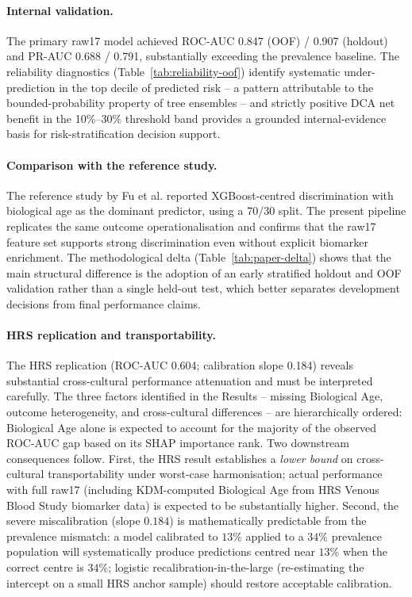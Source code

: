 \documentclass[11pt,a4paper]{article}
\begin{document}
\paragraph{Internal validation.}
The primary raw17 model achieved ROC-AUC 0.847 (OOF) / 0.907 (holdout) and PR-AUC 0.688 / 0.791,
substantially exceeding the prevalence baseline. The reliability diagnostics
(Table~\ref{tab:reliability-oof}) identify systematic under-prediction in the top decile of predicted
risk -- a pattern attributable to the bounded-probability property of tree ensembles\cite{NiculescuMizil2005}
-- and strictly positive DCA net benefit in the 10\%--30\% threshold band provides a grounded
internal-evidence basis for risk-stratification decision support.

\paragraph{Comparison with the reference study.}
The reference study by Fu et al.\cite{Fu2025} reported XGBoost-centred discrimination with biological
age as the dominant predictor, using a 70/30 split. The present pipeline replicates the same outcome
operationalisation and confirms that the raw17 feature set supports strong discrimination even without
explicit biomarker enrichment. The methodological delta (Table~\ref{tab:paper-delta}) shows that the
main structural difference is the adoption of an early stratified holdout and OOF validation rather
than a single held-out test, which better separates development decisions from final performance claims.

\paragraph{HRS replication and transportability.}
The HRS replication (ROC-AUC 0.604; calibration slope 0.184) reveals substantial cross-cultural
performance attenuation and must be interpreted carefully. The three factors identified in the Results
-- missing Biological Age, outcome heterogeneity, and cross-cultural differences -- are hierarchically
ordered: Biological Age alone is expected to account for the majority of the observed ROC-AUC gap
based on its SHAP importance rank. Two downstream consequences follow. First, the HRS result
establishes a \emph{lower bound} on cross-cultural transportability under worst-case harmonisation;
actual performance with full raw17 (including KDM-computed Biological Age from HRS Venous Blood Study
biomarker data) is expected to be substantially higher. Second, the severe miscalibration (slope
$0.184$) is mathematically predictable from the prevalence mismatch: a model calibrated to $13\%$
applied to a $34\%$ prevalence population will systematically produce predictions centred near
$13\%$ when the correct centre is $34\%$; logistic recalibration-in-the-large (re-estimating the
intercept on a small HRS anchor sample) should restore acceptable calibration\cite{Steyerberg2019}.
\end{document}
